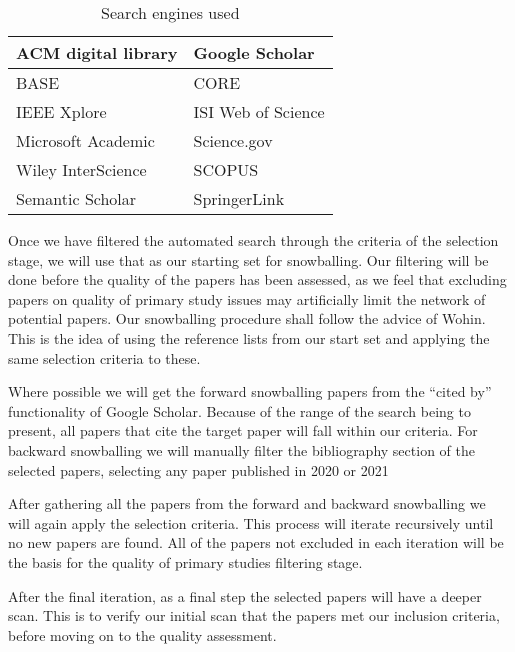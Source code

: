 \begin{table}[H]
    \begin{center}         
        \begin{tabular}{|l||l|}
            \hline
            ACM digital library       & Google Scholar       \\
            \hline
            BASE                      & CORE                 \\
            \hline  
            IEEE Xplore               & ISI Web of Science   \\
            \hline  
            Microsoft Academic        & Science.gov          \\
            \hline  
            Wiley InterScience        & SCOPUS               \\
            \hline  
            Semantic Scholar          & SpringerLink         \\
            \hline  
        \end{tabular}
    \end{center}
    \caption{Search engines used}
    \label{table:searchEngines}
\end{table}

Once we have filtered the automated search through the criteria of the selection stage, we will use that as our starting set for snowballing.
Our filtering will be done before the quality of the papers has been assessed, as we feel that excluding papers on quality of primary study issues may artificially limit the network of potential papers.
Our snowballing procedure shall follow the advice of Wohin\cite{Wohlin_2014}.
This is the idea of using the reference lists from our start set and applying the same selection criteria to these.

Where possible we will get the forward snowballing papers from the ``cited by'' functionality of Google Scholar.
Because of the range of the search being to present, all papers that cite the target paper will fall within our criteria.
For backward snowballing we will manually filter the bibliography section of the selected papers, selecting any paper published in 2020 or 2021

After gathering all the papers from the forward and backward snowballing we will again apply the selection criteria.
This process will iterate recursively until no new papers are found.
All of the papers not excluded in each iteration will be the basis for the quality of primary studies filtering stage.

After the final iteration, as a final step the selected papers will have a deeper scan.
This is to verify our initial scan that the papers met our inclusion criteria, before moving on to the quality assessment.

